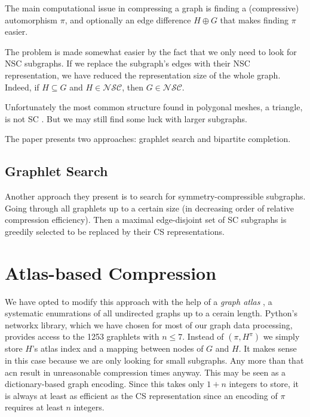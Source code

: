 \documentclass{egpubl}
\begin{document}
The main computational issue in compressing a graph is finding a (compressive) automorphism $\pi$,
and optionally an edge difference $H \oplus G$ that makes finding $\pi$ easier.

The problem is made somewhat easier by the fact that we only need to look for NSC subgraphs. If we replace the subgraph's edges with their NSC representation, we have reduced the representation size of the whole graph. Indeed, if $H \subseteq G$ and $H \in \mathcal{N}\mathcal{S}\mathcal{C}$, then $G \in \mathcal{N}\mathcal{S}\mathcal{C}$.

Unfortunately the most common structure found in polygonal meshes, a triangle, is not SC \cite[Theorem 3]{cibej2021automorphisms}. But we may still find some luck with larger subgraphs.

The paper presents two approaches: graphlet search and bipartite completion.

\subsection{Graphlet Search}
Another approach they present is to search for symmetry-compressible subgraphs. Going through all graphlets up to a certain size (in decreasing order of relative compression efficiency). Then a maximal edge-disjoint set of SC subgraphs is greedily selected to be replaced by their CS representations.

\section{Atlas-based Compression}
We have opted to modify this approach with the help of a \textit{graph atlas} \cite{read1998atlas}, a systematic enumrations of all undirected graphs up to a cerain length. Python's networkx library, which we have chosen for most of our graph data processing, provides access to the 1253 graphlets with $n \leq 7$.
Instead of $(\pi, H^\pi)$ we simply store $H$'s atlas index and a mapping between nodes of $G$ and $H$.
It makes sense in this case because we are only looking for small subgraphs.
Any more than that acn result in unreasonable compression times anyway.
This may be seen as a dictionary-based graph encoding. Since this takes only $1 + n$ integers to store, it is always at least as efficient as the CS representation since an encoding of $\pi$ requires at least $n$ integers.
\end{document}
